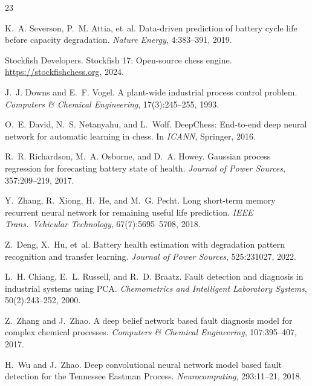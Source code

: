\documentclass[11pt,a4paper]{article}
\begin{document}
\begin{thebibliography}{23}

K.~A. Severson, P.~M. Attia, et~al.
\newblock Data-driven prediction of battery cycle life before capacity degradation.
\newblock \emph{Nature Energy}, 4:383--391, 2019.

Stockfish Developers.
\newblock Stockfish 17: Open-source chess engine.
\newblock \url{https://stockfishchess.org}, 2024.

J.~J. Downs and E.~F. Vogel.
\newblock A plant-wide industrial process control problem.
\newblock \emph{Computers \& Chemical Engineering}, 17(3):245--255, 1993.

O.~E. David, N.~S. Netanyahu, and L.~Wolf.
\newblock DeepChess: End-to-end deep neural network for automatic learning in chess.
\newblock In \emph{ICANN}, Springer, 2016.

R.~R. Richardson, M.~A. Osborne, and D.~A. Howey.
\newblock Gaussian process regression for forecasting battery state of health.
\newblock \emph{Journal of Power Sources}, 357:209--219, 2017.

Y.~Zhang, R.~Xiong, H.~He, and M.~G. Pecht.
\newblock Long short-term memory recurrent neural network for remaining useful life prediction.
\newblock \emph{IEEE Trans.\ Vehicular Technology}, 67(7):5695--5708, 2018.

Z.~Deng, X.~Hu, et~al.
\newblock Battery health estimation with degradation pattern recognition and transfer learning.
\newblock \emph{Journal of Power Sources}, 525:231027, 2022.

L.~H. Chiang, E.~L. Russell, and R.~D. Braatz.
\newblock Fault detection and diagnosis in industrial systems using PCA.
\newblock \emph{Chemometrics and Intelligent Laboratory Systems}, 50(2):243--252, 2000.

Z.~Zhang and J.~Zhao.
\newblock A deep belief network based fault diagnosis model for complex chemical processes.
\newblock \emph{Computers \& Chemical Engineering}, 107:395--407, 2017.

H.~Wu and J.~Zhao.
\newblock Deep convolutional neural network model based fault detection for the Tennessee Eastman Process.
\newblock \emph{Neurocomputing}, 293:11--21, 2018.


\end{thebibliography}
\end{document}
